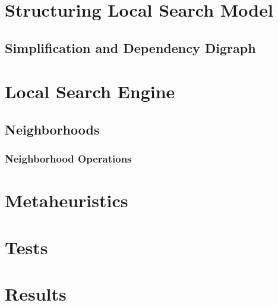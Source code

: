 \documentclass[a4paper,12pt]{article}
\begin{document}
\section{Structuring Local Search Model}

  \subsection{Simplification and Dependency Digraph}
    
    
  
  
\section{Local Search Engine}
  \subsection{Neighborhoods}
    \subsubsection{Neighborhood Operations}
\section{Metaheuristics}
\section{Tests}
\section{Results}
\end{document}
